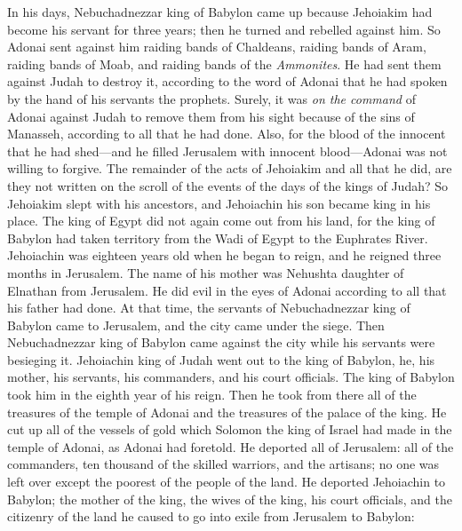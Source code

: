\begin{biblechapter} %
 In his days, Nebuchadnezzar king of Babylon came up because Jehoiakim had become his servant for three years; then he turned and rebelled against him.
\verse So Adonai sent against him raiding bands of Chaldeans, raiding bands of Aram, raiding bands of Moab, and raiding bands of the \textit{Ammonites}. He had sent them against Judah to destroy it, according to the word of Adonai that he had spoken by the hand of his servants the prophets.
\verse Surely, it was \textit{on the command} of Adonai against Judah to remove them from his sight because of the sins of Manasseh, according to all that he had done.
\verse Also, for the blood of the innocent that he had shed—and he filled Jerusalem with innocent blood—Adonai was not willing to forgive.
\verse The remainder of the acts of Jehoiakim and all that he did, are they not written on the scroll of the events of the days of the kings of Judah?
\verse So Jehoiakim slept with his ancestors, and Jehoiachin his son became king in his place.
\verse The king of Egypt did not again come out from his land, for the king of Babylon had taken territory from the Wadi of Egypt to the Euphrates River.
 Jehoiachin was eighteen years old when he began to reign, and he reigned three months in Jerusalem. The name of his mother was Nehushta daughter of Elnathan from Jerusalem.
\verse He did evil in the eyes of Adonai according to all that his father had done.
 At that time, the servants of Nebuchadnezzar king of Babylon came to Jerusalem, and the city came under the siege.
\verse Then Nebuchadnezzar king of Babylon came against the city while his servants were besieging it.
\verse Jehoiachin king of Judah went out to the king of Babylon, he, his mother, his servants, his commanders, and his court officials. The king of Babylon took him in the eighth year of his reign.
\verse Then he took from there all of the treasures of the temple of Adonai and the treasures of the palace of the king. He cut up all of the vessels of gold which Solomon the king of Israel had made in the temple of Adonai, as Adonai had foretold.
\verse He deported all of Jerusalem: all of the commanders, ten thousand of the skilled warriors, and the artisans; no one was left over except the poorest of the people of the land.
\verse He deported Jehoiachin to Babylon; the mother of the king, the wives of the king, his court officials, and the citizenry of the land he caused to go into exile from Jerusalem to Babylon:

\end{biblechapter}
